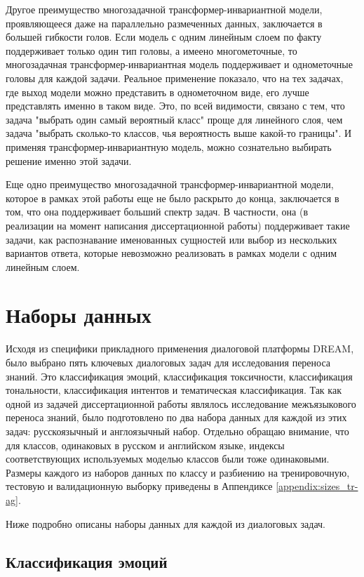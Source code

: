 Другое преимущество многозадачной трансформер-инвариантной модели, проявляющееся даже на параллельно размеченных данных, заключается в большей гибкости голов. Если модель с одним линейным слоем по факту поддерживает только один тип головы, а имеено многометочные, то многозадачная трансформер-инвариантная модель поддерживает и однометочные головы для каждой задачи. Реальное применение показало, что на тех задачах, где выход модели можно представить в однометочном виде, его лучше представлять именно  в таком виде. Это, по всей видимости, связано с тем, что задача "выбрать один самый вероятный класс" проще для линейного слоя, чем задача "выбрать сколько-то классов, чья вероятность выше какой-то границы". И применяя трансформер-инвариантную модель, можно сознательно выбирать решение именно этой задачи.

Еще одно преимущество многозадачной трансформер-инвариантной модели, которое в рамках этой работы еще не было раскрыто до конца, заключается в том, что она поддерживает больший спектр задач. В частности, она (в реализации на момент написания диссертационной работы) поддерживает такие задачи, как распознавание именованных сущностей или выбор из нескольких вариантов ответа, которые невозможно реализовать в рамках модели с одним линейным слоем.


\section{Наборы данных}

Исходя из специфики прикладного применения диалоговой платформы DREAM, было выбрано пять ключевых диалоговых задач для исследования переноса знаний. Это классификация эмоций, классификация токсичности, классификация тональности, классификация интентов и тематическая классификация. Так как одной из задачей диссертационной работы являлось исследование межъязыкового переноса знаний, было подготовлено по два набора данных для каждой из этих задач: русскоязычный и англоязычный набор. Отдельно обращаю внимание, что для классов, одинаковых в русском и английском языке, индексы соответствующих используемых моделью классов были тоже одинаковыми. Размеры каждого из наборов данных по классу и разбиению на тренировочную, тестовую и валидационную выборку приведены в Аппендиксе \ref{appendix:sizes_tr-ag}.

Ниже подробно описаны наборы данных для каждой из диалоговых задач. 

\subsection{Классификация эмоций}
